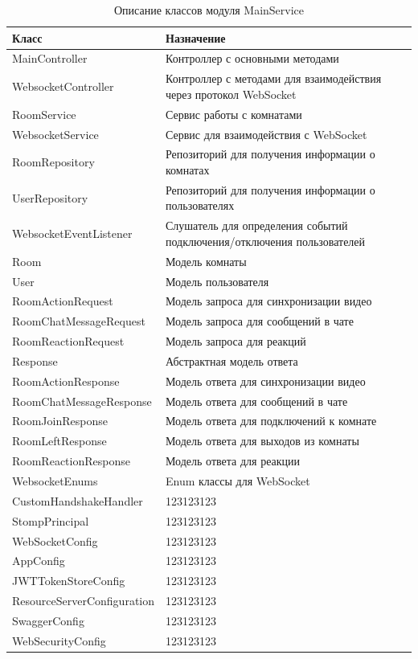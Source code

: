 \documentclass{../includes/TechDoc}
\begin{document}
    \begin{table}[h]
		\caption{\label{tab:class-AuthConfirmView-table}Описание классов модуля MainService}
	    \begin{tabularx}{\textwidth}{|l|X|}
	    	\hline
	  		\textbf{Класс} & \textbf{Назначение} \\
			\hline
			MainController & Контроллер с основными методами \\
			\hline
			WebsocketController & Контроллер с методами для взаимодействия через протокол WebSocket \\
			\hline
			RoomService & Сервис работы с комнатами \\
			\hline
			WebsocketService & Сервис для взаимодействия с WebSocket \\
			\hline
			RoomRepository & Репозиторий для получения информации о комнатах \\
			\hline
			UserRepository & Репозиторий для получения информации о пользователях \\
			\hline
			WebsocketEventListener & Слушатель для определения событий подключения/отключения пользователей \\
			\hline
			Room & Модель комнаты \\
			\hline
			User & Модель пользователя \\
			\hline
			RoomActionRequest & Модель запроса для синхронизации видео \\
			\hline
			RoomChatMessageRequest & Модель запроса для сообщений в чате \\
			\hline
			RoomReactionRequest & Модель запроса для реакций \\
			\hline
			Response & Абстрактная модель ответа \\
			\hline
			RoomActionResponse & Модель ответа для синхронизации видео \\
			\hline
			RoomChatMessageResponse & Модель ответа для сообщений в чате \\
			\hline
			RoomJoinResponse & Модель ответа для подключений к комнате \\
			\hline
			RoomLeftResponse & Модель ответа для выходов из комнаты \\
			\hline
			RoomReactionResponse & Модель ответа для реакции \\
			\hline
			WebsocketEnums & Enum классы для WebSocket \\
			\hline
			CustomHandshakeHandler & 123123123 \\
			\hline
			StompPrincipal & 123123123 \\
			\hline
			WebSocketConfig & 123123123 \\
			\hline
			AppConfig & 123123123 \\
			\hline
			JWTTokenStoreConfig & 123123123 \\
			\hline
			ResourceServerConfiguration & 123123123 \\
			\hline
			SwaggerConfig & 123123123 \\
			\hline
			WebSecurityConfig & 123123123 \\
			\hline
		\end{tabularx}
    \end{table}
\end{document}

